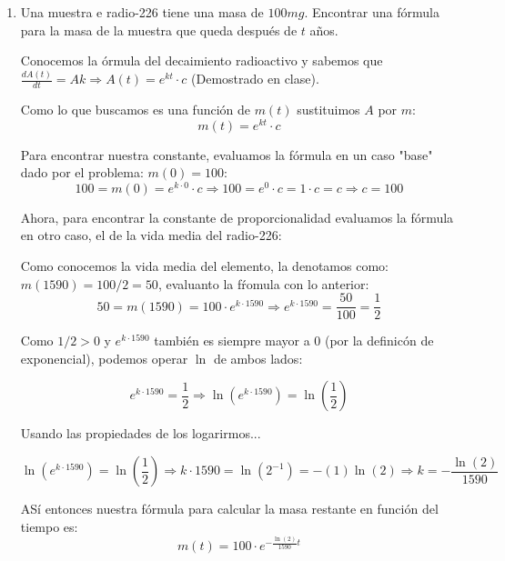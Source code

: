 \documentclass[12pt]{article}
\begin{document}
\begin{enumerate}[\hspace{9px} a)]
    \item Una muestra e radio-226 tiene una masa de $100mg$. Encontrar una fórmula para la masa de la muestra que queda después de $t$ años.\medskip
    
        Conocemos la \'ormula del decaimiento radioactivo y sabemos que \(\displaystyle\frac{dA(t)}{dt}=Ak \Longrightarrow A(t) = e^{kt}\cdot c\) (Demostrado en clase).\medskip

        Como lo que buscamos es una funci\'on de $m(t)$ sustituimos $A$ por $m$:
        \[m(t)=e^{kt}\cdot c\]

        Para encontrar nuestra constante, evaluamos la f\'ormula en un caso "base" dado por el problema: \(m(0)=100\):
        \[100=m(0)=e^{k\cdot0}\cdot c \Longrightarrow 100=e^0\cdot c=1\cdot c=c \Longrightarrow c=100\]

        Ahora, para encontrar la constante de proporcionalidad evaluamos la f\'ormula en otro caso, el de la vida media del radio-226: 
        
        Como conocemos la vida media del elemento, la denotamos como: \(m(1590)=100/2=50\), evaluanto la f\'romula con lo anterior:
        \begin{equation*}
            50=m(1590)=100\cdot e^{k\cdot1590} \Longrightarrow e^{k\cdot1590}=\frac{50}{100}=\frac{1}{2}
        \end{equation*}

        Como \(1/2>0\) y \(e^{k\cdot1590}\) tambi\'en es siempre mayor a 0 (por la definic\'on de exponencial), podemos operar $\ln$ de ambos lados:

        \begin{equation*}
            e^{k\cdot1590}=\frac{1}{2} \Longrightarrow \ln\left(e^{k\cdot1590}\right)=\ln\left(\frac{1}{2}\right)
        \end{equation*}

        Usando las propiedades de los logarirmos...

        \begin{equation*}
            \ln\left(e^{k\cdot1590}\right)=\ln\left(\frac{1}{2}\right) \Longrightarrow k\cdot1590 = \ln(2^{-1}) = -(1)\ln(2) \Longrightarrow k = -\frac{\ln(2)}{1590}
        \end{equation*}

        AS\'i entonces nuestra f\'ormula para calcular la masa restante en funci\'on del tiempo es:
        \[m(t)=100\cdot e^{-\frac{\ln(2)}{1590}t}\]


\end{enumerate}
\end{document}
